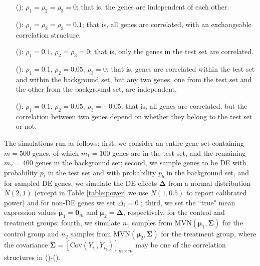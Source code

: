 	\begin{enumerate}
		\item[(\aaCase):] $\rho_1 = \rho_2 = \rho_3 = 0$; that is, the genes are independent of each
		other.
		\item[(\cCase):] $\rho_1 = \rho_2 = \rho_3 = 0.1$; that is, all genes are correlated, with 
		an exchangeable correlation structure. 
		\item[(\aCase):] $\rho_1 = 0.1$, $\rho_2 = \rho_3 = 0$; that is, only the genes in the test 
		set are correlated.%
		\item[(\eCase):] $\rho_1 = 0.1$, $\rho_2 = 0.05$, $\rho_3 = 0$; that is, 
		genes are correlated within the test set and within the background set, but any two genes, 
		one from the test set and the other from the background set, are independent.
		\item[(\fCase):] $\rho_1 = 0.1$, $\rho_2 = 0.05$, $\rho_3 = -0.05$; that is, all genes are
		correlated, but the correlation between two genes depend on whether they belong to the test 
		set or not.
	\end{enumerate}
	
	The simulations run as follows: first, we consider an entire gene set containing $m=500$ genes,
	of which $m_1 = 100$ genes are in the test set, and the
	remaining $m_2=400$ genes in the background set; second, we sample genes to be DE with 
	probability $p_t$ in the test set and with probability $p_b$ in the background set, and for 
	sampled DE genes, we simulate the DE effects $\bm \Delta$ from  a normal distribution $N(2, 1)$ 
	(except in Table \ref{table:power} we use $N(1, 0.5)$ to report calibrated power) and for 
	non-DE genes we set $\Delta_i= 0$ ; third, we set the ``true" mean expression values $\bm \mu_1 
	= \bm 0_m$ and $\bm \mu_2 = \bm \Delta$, respectively, for the control and treatment groups; 
	fourth, we simulate $n_1$ samples from $\text{MVN}(\bm \mu_1, \bm \Sigma)$ for the control 
	group and $n_2$ samples from $\text{MVN}(\bm \mu_2, \bm \Sigma)$ for
	the treatment group, where the covariance $\bm \Sigma = \left[\text{Cov}(Y_{i_1},
	Y_{i_2})\right]_{m\times m}$ may be one of the correlation structures in (\aaCase)-(\fCase).
	
